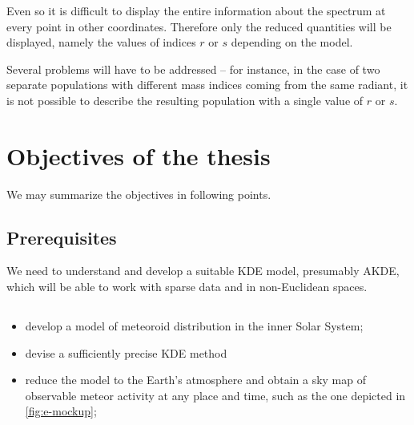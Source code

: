            Even so it is difficult to display the entire information about the spectrum at every point
            in other coordinates. Therefore only the reduced quantities will be displayed,
            namely the values of indices $r$ or $s$ depending on the model.

            Several problems will have to be addressed -- for instance, in the case of
            two separate populations with different mass indices coming from the same radiant,
            it is not possible to describe the resulting population with a single value of $r$ or $s$.

\section{Objectives of the thesis} \label{iO}

    We may summarize the objectives in following points.
    
    \subsection{Prerequisites} \label{iOp}
        We need to understand and develop a suitable KDE model, presumably AKDE,
        which will be able to work with sparse data and in non-Euclidean spaces.

    \subsection{}

    \begin{itemize}
        \item develop a model of meteoroid distribution in the inner Solar System;
        \item devise a sufficiently precise KDE method 
        \item reduce the model to the Earth's atmosphere and obtain a sky map
            of observable meteor activity at any place and time,
            such as the one depicted in \cref{fig:e-mockup};
    \end{itemize}

